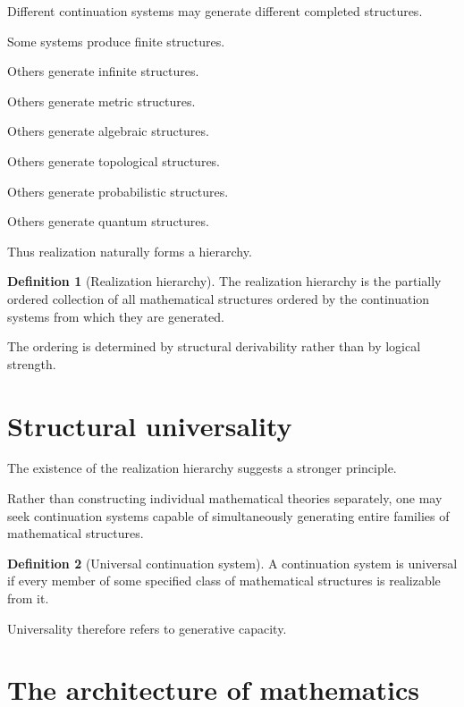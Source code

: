 \documentclass[13pt,openany]{book}
\theoremstyle{plain}
\theoremstyle{definition}
\newtheorem{definition}{Definition}[chapter]
\begin{document}
Different continuation systems may generate different completed structures.

Some systems produce finite structures.

Others generate infinite structures.

Others generate metric structures.

Others generate algebraic structures.

Others generate topological structures.

Others generate probabilistic structures.

Others generate quantum structures.

Thus realization naturally forms a hierarchy.

\begin{definition}[Realization hierarchy]
The realization hierarchy is the partially ordered collection of all
mathematical structures ordered by the continuation systems from which they
are generated.
\end{definition}

The ordering is determined by structural derivability rather than by logical
strength.


\section{Structural universality}

The existence of the realization hierarchy suggests a stronger principle.

Rather than constructing individual mathematical theories separately, one
may seek continuation systems capable of simultaneously generating entire
families of mathematical structures.

\begin{definition}[Universal continuation system]
A continuation system is universal if every member of some specified class
of mathematical structures is realizable from it.
\end{definition}

Universality therefore refers to generative capacity.


\section{The architecture of mathematics}
\end{document}
